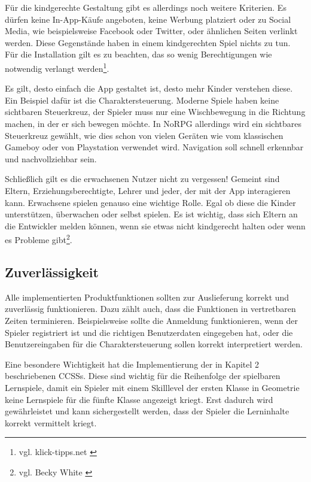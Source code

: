 		Für die kindgerechte Gestaltung gibt es allerdings noch weitere Kriterien. Es dürfen keine In-App-Käufe angeboten, keine Werbung platziert oder zu Social Media, wie beispielsweise Facebook oder Twitter, oder ähnlichen Seiten verlinkt werden. Diese Gegenstände haben in einem kindgerechten Spiel nichts zu tun. Für die Installation gilt es zu beachten, das so wenig Berechtigungen wie notwendig verlangt werden\footnote{vgl. klick-tipps.net \cite{appsforkids}}.
		
		Es gilt, desto einfach die App gestaltet ist, desto mehr Kinder verstehen diese. Ein Beispiel dafür ist die Charaktersteuerung. Moderne Spiele haben keine sichtbaren Steuerkreuz, der Spieler muss nur eine Wischbewegung in die Richtung machen, in der er sich bewegen möchte. In NoRPG allerdings wird ein sichtbares Steuerkreuz gewählt, wie dies schon von vielen Geräten wie vom klassischen Gameboy oder von Playstation verwendet wird. Navigation soll schnell erkennbar und nachvollziehbar sein.
		
		Schließlich gilt es die erwachsenen Nutzer nicht zu vergessen! Gemeint sind Eltern, Erziehungsberechtigte, Lehrer und jeder, der mit der App interagieren kann. Erwachsene spielen genauso eine wichtige Rolle. Egal ob diese die Kinder unterstützen, überwachen oder selbst spielen. Es ist wichtig, dass sich Eltern an die Entwickler melden können, wenn sie etwas nicht kindgerecht halten oder wenn es Probleme gibt\footnote{vgl. Becky White \cite{smashMagazin}}.	

	\subsection{Zuverlässigkeit}
		Alle implementierten Produktfunktionen sollten zur Auslieferung korrekt und zuverlässig funktionieren. Dazu zählt auch, dass die Funktionen in vertretbaren Zeiten terminieren. Beispielsweise sollte die Anmeldung funktionieren, wenn der Spieler registriert ist und die richtigen Benutzerdaten eingegeben hat, oder die Benutzereingaben für die Charaktersteuerung sollen korrekt interpretiert werden.
		
		Eine besondere Wichtigkeit hat die Implementierung der in Kapitel 2 beschriebenen \acp{CCSS}. Diese sind wichtig für die Reihenfolge der spielbaren Lernspiele, damit ein Spieler mit einem Skilllevel der ersten Klasse in Geometrie keine Lernspiele für die fünfte Klasse angezeigt kriegt. Erst dadurch wird gewährleistet und kann sichergestellt werden, dass der Spieler die Lerninhalte korrekt vermittelt kriegt.
	
